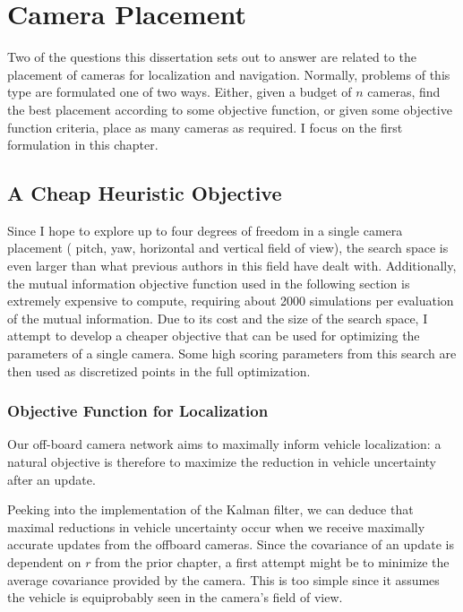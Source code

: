 \documentclass[a4paper,12pt,twoside,openright]{report}
\begin{document}
\chapter{Camera Placement}
\label{chap:cameraplacement}

Two of the questions this dissertation sets out to answer
are related to the placement of cameras for localization and navigation.
Normally, problems of this type are formulated one of two ways. Either,
given a budget of $n$ cameras, find the best placement according to
some objective function, or given some objective function criteria,
place as many cameras as required. I focus on the first formulation
in this chapter.


\section{A Cheap Heuristic Objective}
\label{cameraplacement:cheap}

Since I hope to explore up to four degrees of freedom in a single camera placement (
pitch, yaw, horizontal and vertical field of view), the search space is even larger
than what previous authors in this field have dealt with. Additionally,
the mutual information objective function used in the following section is extremely expensive to compute, 
requiring about 2000 simulations per evaluation of the mutual information.
Due to its cost and the size of the search space, I attempt to develop a cheaper objective that can be used for optimizing
the parameters of a single camera. Some high scoring parameters from this search are then used
as discretized points in the full optimization.

\subsection{Objective Function for Localization}

Our off-board camera network aims to maximally inform vehicle localization: a natural
objective is therefore to maximize the reduction in vehicle uncertainty
after an update. 

Peeking into the implementation of the Kalman filter,
we can deduce that maximal reductions in vehicle uncertainty occur when we receive
maximally accurate updates from the offboard cameras. Since
the covariance of an update is dependent on $r$ from the prior chapter,
a first attempt might be to minimize the average covariance
provided by the camera. This is too simple since it assumes the vehicle is equiprobably 
seen in the camera's field of view.
\end{document}
